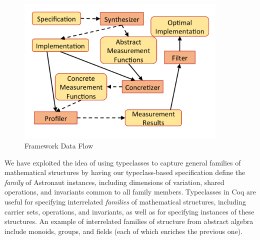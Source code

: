 \documentclass{sig-alternate}
\begin{document}

\begin{figure}[b!]
\centering
\includegraphics[width=0.9\textwidth]{img/structure}
\caption{Framework Data Flow}
\label{fig:framework_structure}
\end{figure}


We have exploited the idea of using typeclasses to capture general families of mathematical structures by having our typeclass-based specification define the {\em family} of Astronaut instances, including dimensions of variation, shared operations, and invariants common to all family members. %
Typeclasses in Coq are useful for specifying interrelated {\em families} of mathematical structures, including carrier sets, operations, and invariants, as well as for specifying instances of these structures. An example of interrelated families of structure from abstract algebra include monoids, groups, and fields (each of which enriches the previous one).
\end{document}
